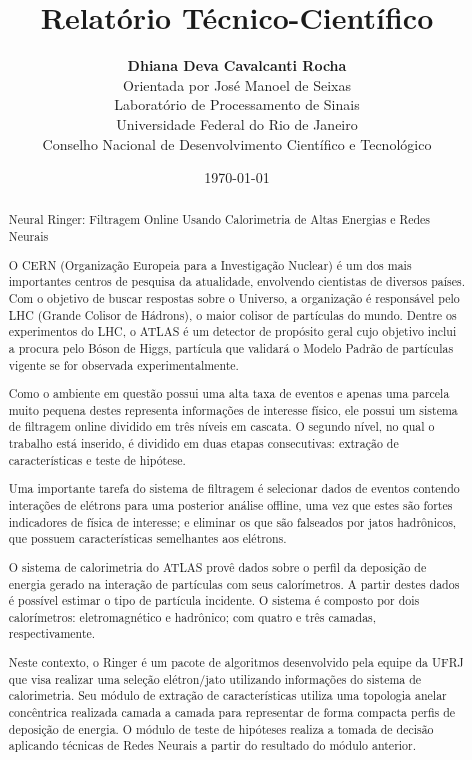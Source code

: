 \documentclass[a4paper,10pt,titlepage]{article}
\title{Relatório Técnico-Científico}
\author{{\bf Dhiana Deva Cavalcanti Rocha}
      \\Orientada por José Manoel de Seixas
      \\Laboratório de Processamento de Sinais
      \\Universidade Federal do Rio de Janeiro
      \\Conselho Nacional de Desenvolvimento Científico e Tecnológico
}
\date{\today}
\begin{document}
\maketitle

\tableofcontents

\pagebreak

\listoffigures

\begin{abstract}

Neural Ringer: Filtragem Online Usando Calorimetria de Altas Energias e Redes Neurais

O CERN (Organização Europeia para a Investigação Nuclear) é um dos mais importantes centros de pesquisa da atualidade, envolvendo cientistas de diversos países.
Com o objetivo de buscar respostas sobre o Universo, a organização é responsável pelo LHC (Grande Colisor de Hádrons), o maior colisor de partículas do mundo.
Dentre os experimentos do LHC, o ATLAS é um detector de propósito geral cujo objetivo inclui a procura pelo Bóson de Higgs, partícula que validará o Modelo Padrão de partículas vigente se for observada experimentalmente.

Como o ambiente em questão possui uma alta taxa de eventos e apenas uma parcela muito pequena destes representa informações de interesse físico, ele possui um sistema de filtragem online dividido em três níveis em cascata.
O segundo nível, no qual o trabalho está inserido, é dividido em duas etapas consecutivas: extração de características e teste de hipótese.

Uma importante tarefa do sistema de filtragem é selecionar dados de eventos contendo interações de elétrons para uma posterior análise offline, uma vez que estes são fortes indicadores de física de interesse; e eliminar os que são falseados por jatos hadrônicos, que possuem características semelhantes aos elétrons.

O sistema de calorimetria do ATLAS provê dados sobre o perfil da deposição de energia gerado na interação de partículas com seus calorímetros.
A partir destes dados é possível estimar o tipo de partícula incidente.
O sistema é composto por dois calorímetros: eletromagnético e hadrônico; com quatro e três camadas, respectivamente.

Neste contexto, o Ringer é um pacote de algoritmos desenvolvido pela equipe da UFRJ que visa realizar uma seleção elétron/jato utilizando informações do sistema de calorimetria.
Seu módulo de extração de características utiliza uma topologia anelar concêntrica realizada camada a camada para representar de forma compacta perfis de deposição de energia.
O módulo de teste de hipóteses realiza a tomada de decisão aplicando técnicas de Redes Neurais a partir do resultado do módulo anterior.


\end{abstract}
\end{document}
